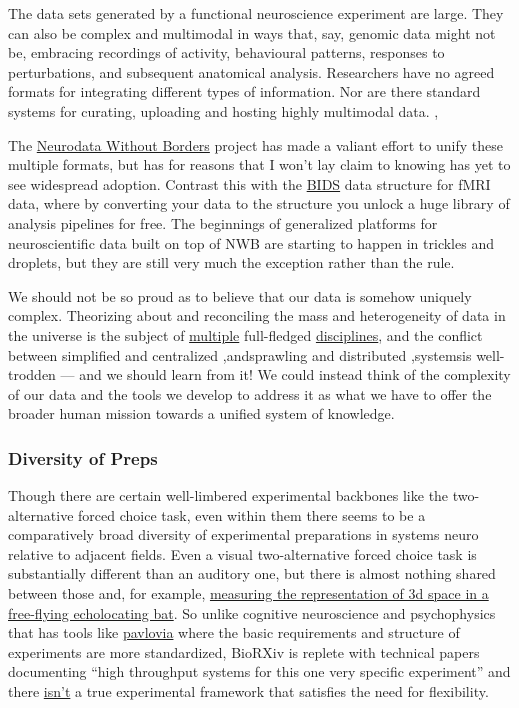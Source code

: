 \documentclass[nohyper]{tufte-book-jls}
\begin{document}
\begin{leftbar}
The data sets generated by a functional neuroscience experiment are
large. They can also be complex and multimodal in ways that, say,
genomic data might not be, embracing recordings of activity, behavioural
patterns, responses to perturbations, and subsequent anatomical
analysis. Researchers have no agreed formats for integrating different
types of information. Nor are there standard systems for curating,
uploading and hosting highly multimodal data. \cite{mainenBetterWayCrack2016},\end{leftbar}
The \href{https://www.nwb.org/}{Neurodata Without Borders} project has
made a valiant effort to unify these multiple formats, but has for
reasons that I won't lay claim to knowing has yet to see widespread
adoption. Contrast this with the
\href{https://bids.neuroimaging.io/}{BIDS} data structure for fMRI data,
where by converting your data to the structure you unlock a huge library
of analysis pipelines for free. The beginnings of generalized platforms
for neuroscientific data built on top of NWB are starting to happen in
trickles and droplets, but they are still very much the exception rather
than the rule.

We should not be so proud as to believe that our data is somehow
uniquely complex. Theorizing about and reconciling the mass and
heterogeneity of data in the universe is the subject of
\href{https://en.wikipedia.org/wiki/Information_science}{multiple}
full-fledged
\href{https://en.wikipedia.org/wiki/Library_science}{disciplines}, and
the conflict between simplified and centralized \cite{bakerMaintainingDublinCore2005},andsprawling and distributed \cite{berners-leeSEMANTICWEB2001},systemsis well-trodden --- and we
should learn from it! We could instead think of the complexity of our
data and the tools we develop to address it as what we have to offer the
broader human mission towards a unified system of knowledge.

\hypertarget{diversity-of-preps}{%
\subsubsection{Diversity of Preps}\label{diversity-of-preps}}

Though there are certain well-limbered experimental backbones like the
two-alternative forced choice task, even within them there seems to be a
comparatively broad diversity of experimental preparations in systems
neuro relative to adjacent fields. Even a visual two-alternative forced
choice task is substantially different than an auditory one, but there
is almost nothing shared between those and, for example,
\href{https://doi.org/10.7554/eLife.29053}{measuring the representation
of 3d space in a free-flying echolocating bat}. So unlike cognitive
neuroscience and psychophysics that has tools like
\href{https://pavlovia.org/}{pavlovia} where the basic requirements and
structure of experiments are more standardized, BioRXiv is replete with
technical papers documenting ``high throughput systems for this one very
specific experiment'' and there
\href{https://docs.auto-pi-lot.com}{isn't} a true experimental framework
that satisfies the need for flexibility.
\end{document}
